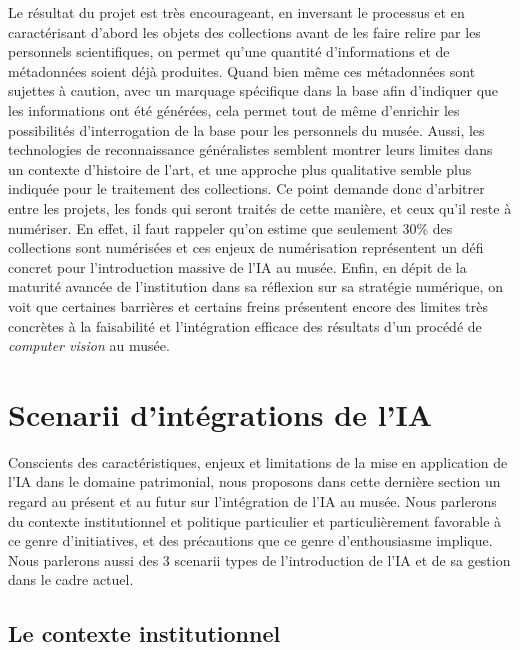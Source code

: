 Le résultat du projet est très encourageant, en inversant le processus et en caractérisant d'abord les objets des collections avant de les faire relire par les personnels scientifiques, on permet qu'une quantité d'informations et de métadonnées soient déjà produites. Quand bien même ces métadonnées sont sujettes à caution, avec un marquage spécifique dans la base afin d'indiquer que les informations ont été générées, cela permet tout de même d'enrichir les possibilités d'interrogation de la base pour les personnels du musée. Aussi, les technologies de reconnaissance généralistes semblent montrer leurs limites dans un contexte d'histoire de l'art, et une approche plus qualitative semble plus indiquée pour le traitement des collections. Ce point demande donc d'arbitrer entre les projets, les fonds qui seront traités de cette manière, et ceux qu'il reste à numériser. En effet, il faut rappeler qu'on estime que seulement 30\% des collections sont numérisées et ces enjeux de numérisation représentent un défi concret pour l'introduction massive de l'IA au musée. Enfin, en dépit de la maturité avancée de l'institution dans sa réflexion sur sa stratégie numérique, on voit que certaines barrières et certains freins présentent encore des limites très concrètes à la faisabilité et l'intégration efficace des résultats d'un procédé de \textit{computer vision} au musée.

\section{Scenarii d’intégrations de l'IA}

Conscients des caractéristiques, enjeux et limitations de la mise en application de l'IA dans le domaine patrimonial, nous proposons dans cette dernière section un regard au présent et au futur sur l'intégration de l'IA au musée. Nous parlerons du contexte institutionnel et politique particulier et particulièrement favorable à ce genre d'initiatives, et des précautions que ce genre d'enthousiasme implique. Nous parlerons aussi des 3 scenarii types de l'introduction de l'IA et de sa gestion dans le cadre actuel. 

\subsection{Le contexte institutionnel}


